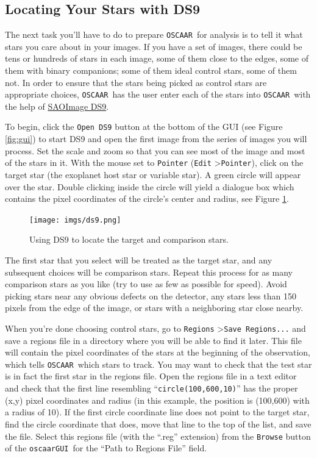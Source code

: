 \documentclass[a4paper]{article}
\newcommand{\code}[1]{\texttt{#1}}
\newcommand{\oscaar}{\code{OSCAAR}~}
\newcommand{\gui}{\code{oscaarGUI}~}
\begin{document}
\subsection{Locating Your Stars with DS9} \label{sec:locatingStars}

The next task you'll have to do to prepare \oscaar for analysis is to tell it what stars you care about in your images. If you have a set of images, there could be tens or hundreds of stars in each image, some of them close to the edges, some of them with binary companions; some of them ideal control stars, some of them not. In order to ensure that the stars being picked as control stars are appropriate choices, \oscaar has the user enter each of the stars into \oscaar with the help of \href{http://hea-www.harvard.edu/RD/ds9/site/Home.html}{SAOImage DS9}. 

To begin, click the \code{Open DS9} button at the bottom of the GUI (see Figure \ref{fig:gui}) to start DS9 and open the first image from the series of images you will process. Set the scale and zoom so that you can see most of the image and most of the stars in it. With the mouse set to \code{Pointer} (\code{Edit} \textgreater  \code{Pointer}), click on the target star (the exoplanet host star or variable star). A green circle will appear over the star. Double clicking inside the circle will yield a dialogue box which contains the pixel coordinates of the circle's center and radius, see Figure \ref{fig:ds9}. 
\begin{figure}[H]
\begin{center}
\texttt{[image: imgs/ds9.png]}
\caption{Using DS9 to locate the target and comparison stars.}
\label{fig:ds9}
\end{center}	
\end{figure}
The first star that you select will be treated as the target star, and any subsequent choices will be comparison stars. Repeat this process for as many comparison stars as you like (try to use as few as possible for speed). Avoid picking stars near any obvious defects on the detector, any stars less than 150 pixels from the edge of the image, or stars with a neighboring star close nearby. 

When you're done choosing control stars, go to \code{Regions} \textgreater  \code{Save Regions...} and save a regions file in a directory where you will be able to find it later. This file will contain the pixel coordinates of the stars at the beginning of the observation, which tells \oscaar which stars to track. You may want to check that the test star is in fact the first star in the regions file. Open the regions file in a text editor and check that the first line resembling ``\code{circle(100,600,10)}'' has the proper (x,y) pixel coordinates and radius (in this example, the position is (100,600) with a radius of 10). If the first circle coordinate line does not point to the target star, find the circle coordinate that does, move that line to the top of the list, and save the file. Select this regions file (with the ``.reg'' extension) from the \code{Browse} button of the \gui for the ``Path to Regions File'' field.
\end{document}
